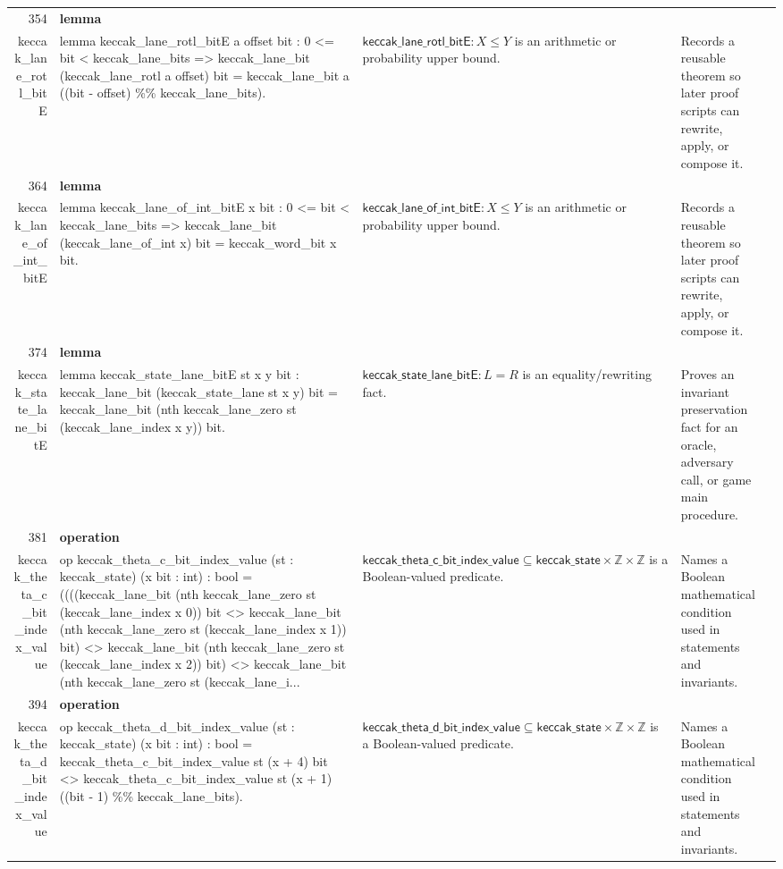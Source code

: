 \documentclass[10pt]{article}
\newcommand{\ec}[1]{\begingroup\ttfamily\scriptsize #1\endgroup}
\begin{document}
\begin{longtable}{r L{0.17\textwidth} L{0.26\textwidth} L{0.27\textwidth} L{0.20\textwidth}}
354 & \textbf{lemma}\\\ec{keccak\_lane\_rotl\_bitE} & \ec{lemma keccak\_lane\_rotl\_bitE a offset bit : 0 <= bit < keccak\_lane\_bits => keccak\_lane\_bit (keccak\_lane\_rotl a offset) bit = keccak\_lane\_bit a ((bit - offset) \%\% keccak\_lane\_bits).} & \(\mathsf{keccak\_lane\_rotl\_bitE} : X \le Y\) is an arithmetic or probability upper bound. & Records a reusable theorem so later proof scripts can rewrite, apply, or compose it. \\
364 & \textbf{lemma}\\\ec{keccak\_lane\_of\_int\_bitE} & \ec{lemma keccak\_lane\_of\_int\_bitE x bit : 0 <= bit < keccak\_lane\_bits => keccak\_lane\_bit (keccak\_lane\_of\_int x) bit = keccak\_word\_bit x bit.} & \(\mathsf{keccak\_lane\_of\_int\_bitE} : X \le Y\) is an arithmetic or probability upper bound. & Records a reusable theorem so later proof scripts can rewrite, apply, or compose it. \\
374 & \textbf{lemma}\\\ec{keccak\_state\_lane\_bitE} & \ec{lemma keccak\_state\_lane\_bitE st x y bit : keccak\_lane\_bit (keccak\_state\_lane st x y) bit = keccak\_lane\_bit (nth keccak\_lane\_zero st (keccak\_lane\_index x y)) bit.} & \(\mathsf{keccak\_state\_lane\_bitE} : L = R\) is an equality/rewriting fact. & Proves an invariant preservation fact for an oracle, adversary call, or game main procedure. \\
381 & \textbf{operation}\\\ec{keccak\_theta\_c\_bit\_index\_value} & \ec{op keccak\_theta\_c\_bit\_index\_value (st : keccak\_state) (x bit : int) : bool = ((((keccak\_lane\_bit (nth keccak\_lane\_zero st (keccak\_lane\_index x 0)) bit <> keccak\_lane\_bit (nth keccak\_lane\_zero st (keccak\_lane\_index x 1)) bit) <> keccak\_lane\_bit (nth keccak\_lane\_zero st (keccak\_lane\_index x 2)) bit) <> keccak\_lane\_bit (nth keccak\_lane\_zero st (keccak\_lane\_i...} & \(\mathsf{keccak\_theta\_c\_bit\_index\_value} \subseteq \mathsf{keccak\_state} \times \mathbb{Z} \times \mathbb{Z}\) is a Boolean-valued predicate. & Names a Boolean mathematical condition used in statements and invariants. \\
394 & \textbf{operation}\\\ec{keccak\_theta\_d\_bit\_index\_value} & \ec{op keccak\_theta\_d\_bit\_index\_value (st : keccak\_state) (x bit : int) : bool = keccak\_theta\_c\_bit\_index\_value st (x + 4) bit <> keccak\_theta\_c\_bit\_index\_value st (x + 1) ((bit - 1) \%\% keccak\_lane\_bits).} & \(\mathsf{keccak\_theta\_d\_bit\_index\_value} \subseteq \mathsf{keccak\_state} \times \mathbb{Z} \times \mathbb{Z}\) is a Boolean-valued predicate. & Names a Boolean mathematical condition used in statements and invariants. \\

\end{longtable}
\end{document}
